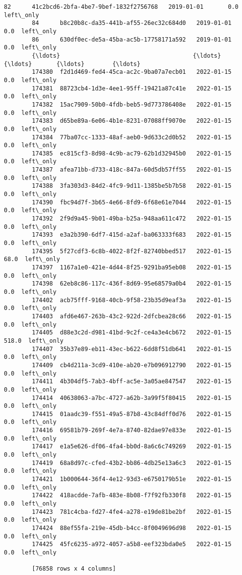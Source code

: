 \documentclass[11pt]{article}
\begin{document}
\begin{Verbatim}[commandchars=\\\{\}]
        82      41c2bcd6-2bfa-4be7-9bef-1832f2756768   2019-01-01       0.0  left\_only
        84      b8c20b8c-da35-441b-af55-26ec32c684d0   2019-01-01       0.0  left\_only
        86      630df0ec-de5a-45ba-ac5b-17758171a592   2019-01-01       0.0  left\_only
        {\ldots}                                      {\ldots}          {\ldots}       {\ldots}        {\ldots}
        174380  f2d1d469-fed4-45ca-ac2c-9ba07a7ecb01   2022-01-15       0.0  left\_only
        174381  88723cb4-1d3e-4ee1-95ff-19421a87c41e   2022-01-15       0.0  left\_only
        174382  15ac7909-50b0-4fdb-beb5-9d773786408e   2022-01-15       0.0  left\_only
        174383  d65be89a-6e06-4b1e-8231-07088ff9070e   2022-01-15       0.0  left\_only
        174384  77ba07cc-1333-48af-aeb0-9d633c2d0b52   2022-01-15       0.0  left\_only
        174385  ec815cf3-8d98-4c9b-ac79-62b1d32945b0   2022-01-15       0.0  left\_only
        174387  afea71bb-d733-418c-847a-60d5db57ff55   2022-01-15       0.0  left\_only
        174388  3fa303d3-84d2-4fc9-9d11-1385be5b7b58   2022-01-15       0.0  left\_only
        174390  fbc94d7f-3b65-4e66-8fd9-6f68e61e7044   2022-01-15       0.0  left\_only
        174392  2f9d9a45-9b01-49ba-b25a-948aa611c472   2022-01-15       0.0  left\_only
        174393  e3a2b390-6df7-415d-a2af-ba063333f683   2022-01-15       0.0  left\_only
        174395  5f27cdf3-6c8b-4022-8f2f-82740bbed517   2022-01-15      68.0  left\_only
        174397  1167a1e0-421e-4d44-8f25-9291ba95eb08   2022-01-15       0.0  left\_only
        174398  62eb8c86-117c-436f-8d69-95e68579a0b4   2022-01-15       0.0  left\_only
        174402  acb75fff-9168-40cb-9f58-23b35d9eaf3a   2022-01-15       0.0  left\_only
        174403  afd6e467-263b-43c2-922d-2dfcbea28c66   2022-01-15       0.0  left\_only
        174405  d88e3c2d-d981-41bd-9c2f-ce4a3e4cb672   2022-01-15     518.0  left\_only
        174407  35b37e89-eb11-43ec-b622-6dd8f51db641   2022-01-15       0.0  left\_only
        174409  cb4d211a-3cd9-410e-ab20-e7b096912790   2022-01-15       0.0  left\_only
        174411  4b304df5-7ab3-4bff-ac5e-3a05ae847547   2022-01-15       0.0  left\_only
        174414  40638063-a7bc-4727-a62b-3a99f5f80415   2022-01-15       0.0  left\_only
        174415  01aadc39-f551-49a5-87b8-43c84dff0d76   2022-01-15       0.0  left\_only
        174416  69581b79-269f-4e7a-8740-82dae97e833e   2022-01-15       0.0  left\_only
        174417  e1a5e626-df06-4fa4-bb0d-8a6c6c749269   2022-01-15       0.0  left\_only
        174419  68a8d97c-cfed-43b2-bb86-4db25e13a6c3   2022-01-15       0.0  left\_only
        174421  1b000644-36f4-4e12-93d3-e6750179b51e   2022-01-15       0.0  left\_only
        174422  418acdde-7afb-483e-8b08-f7f92fb330f8   2022-01-15       0.0  left\_only
        174423  781c4cba-fd27-4fe4-a278-e19de81be2bf   2022-01-15       0.0  left\_only
        174424  88ef55fa-219e-45db-b4cc-8f0049696d98   2022-01-15       0.0  left\_only
        174425  45fc6235-a972-4057-a5b8-eef323bda0e5   2022-01-15       0.0  left\_only
        
        [76858 rows x 4 columns]
\end{Verbatim}
            
\end{document}
